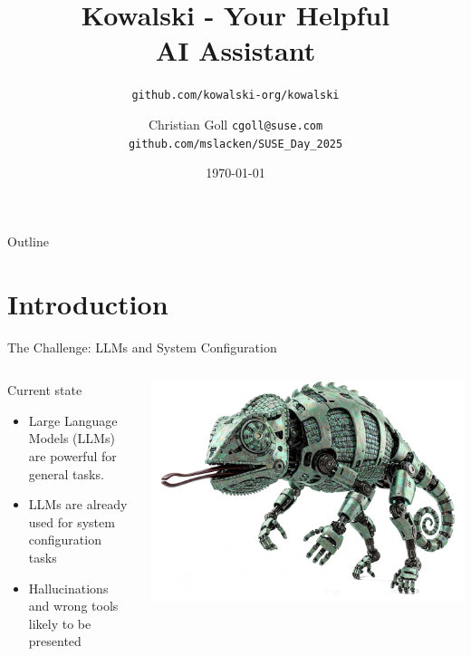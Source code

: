 \documentclass[aspectratio=169]{beamer}
\title{Kowalski - Your Helpful \\AI Assistant}
\author{Christian Goll \texttt{cgoll@suse.com}\\\texttt{github.com/mslacken/SUSE\_Day\_2025}}
\subtitle{\texttt{github.com/kowalski-org/kowalski}}
\date{\today}
\begin{document}
\begin{frame}
  \titlepage
\end{frame}

\begin{frame}{Outline}
  \tableofcontents
\end{frame}

\section{Introduction}
\begin{frame}[fragile]{The Challenge: LLMs and System Configuration}
\begin{columns}
  \begin{block}{Current state}
    \begin{itemize}
      \item Large Language Models (LLMs) are powerful for general tasks.
      \item LLMs are already used for system configuration tasks
      \item Hallucinations and wrong tools likely to be presented
    \end{itemize}
  \end{block}
  \includegraphics[width=\linewidth]{RobotChameleon}
\end{columns}
\end{frame}
\end{document}
